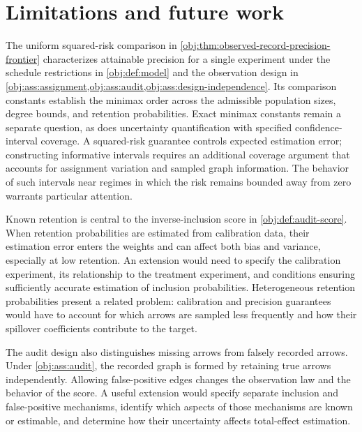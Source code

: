 \section{Limitations and future work}

The uniform squared-risk comparison in \cref{obj:thm:observed-record-precision-frontier} characterizes attainable precision for a single experiment under the schedule restrictions in \cref{obj:def:model} and the observation design in \cref{obj:ass:assignment,obj:ass:audit,obj:ass:design-independence}. Its comparison constants establish the minimax order across the admissible population sizes, degree bounds, and retention probabilities. Exact minimax constants remain a separate question, as does uncertainty quantification with specified confidence-interval coverage. A squared-risk guarantee controls expected estimation error; constructing informative intervals requires an additional coverage argument that accounts for assignment variation and sampled graph information. The behavior of such intervals near regimes in which the risk remains bounded away from zero warrants particular attention.

Known retention is central to the inverse-inclusion score in \cref{obj:def:audit-score}. When retention probabilities are estimated from calibration data, their estimation error enters the weights and can affect both bias and variance, especially at low retention. An extension would need to specify the calibration experiment, its relationship to the treatment experiment, and conditions ensuring sufficiently accurate estimation of inclusion probabilities. Heterogeneous retention probabilities present a related problem: calibration and precision guarantees would have to account for which arrows are sampled less frequently and how their spillover coefficients contribute to the target.

The audit design also distinguishes missing arrows from falsely recorded arrows. Under \cref{obj:ass:audit}, the recorded graph is formed by retaining true arrows independently. Allowing false-positive edges changes the observation law and the behavior of the score. A useful extension would specify separate inclusion and false-positive mechanisms, identify which aspects of those mechanisms are known or estimable, and determine how their uncertainty affects total-effect estimation.

